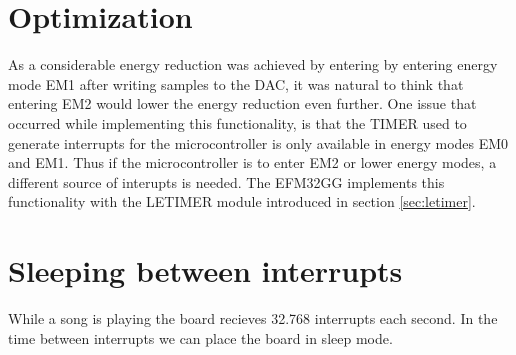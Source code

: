 \section{Optimization}

As a considerable energy reduction was achieved by entering by entering energy mode EM1 after writing samples to the DAC, it was natural to think that entering EM2 would lower the energy reduction even further. One issue that occurred while implementing this functionality, is that the TIMER used to generate interrupts for the microcontroller is only available in energy modes EM0 and EM1. Thus if the microcontroller is to enter EM2 or lower energy modes, a different source of interupts is needed. The EFM32GG implements this functionality with the LETIMER module introduced in section \ref{sec:letimer}.

\section{Sleeping between interrupts}
While a song is playing the board recieves 32.768 interrupts each second. In the time between interrupts we can place the board in sleep mode.
